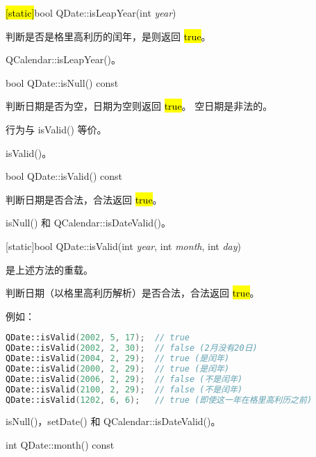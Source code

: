 \splitLine

\hl{[static]}bool QDate::isLeapYear(int \emph{year})

判断是否是格里高利历的闰年，是则返回 \hl{true}。

\begin{notice}[另请参阅]
QCalendar::isLeapYear()。
\end{notice}

\splitLine

bool QDate::isNull() const

判断日期是否为空，日期为空则返回 \hl{true}。 空日期是非法的。

\begin{notice}
行为与 isValid() 等价。
\end{notice}

\begin{notice}[另请参阅]
isValid()。
\end{notice}

\splitLine

bool QDate::isValid() const

判断日期是否合法，合法返回 \hl{true}。



\begin{notice}[另请参阅]
isNull() 和 QCalendar::isDateValid()。
\end{notice}

\splitLine

[static]bool QDate::isValid(int \emph{year}, int \emph{month}, int \emph{day})

是上述方法的重载。

判断日期（以格里高利历解析）是否合法，合法返回 \hl{true}。

例如：

\begin{lstlisting}[language=C++]
QDate::isValid(2002, 5, 17);  // true
QDate::isValid(2002, 2, 30);  // false (2月没有20日)
QDate::isValid(2004, 2, 29);  // true (是闰年)
QDate::isValid(2000, 2, 29);  // true (是闰年)
QDate::isValid(2006, 2, 29);  // false (不是闰年)
QDate::isValid(2100, 2, 29);  // false (不是闰年)
QDate::isValid(1202, 6, 6);   // true (即使这一年在格里高利历之前)
\end{lstlisting}


\begin{notice}[另请参阅]
isNull()，setDate() 和 QCalendar::isDateValid()。
\end{notice}

\splitLine

int QDate::month() const


